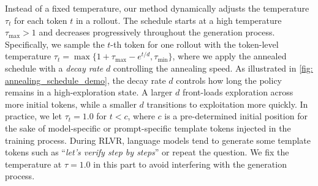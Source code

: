 Instead of a fixed temperature, our method dynamically adjusts the temperature $\tau_t$ for each token $t$ in a rollout. The schedule starts at a high temperature $\tau_\mathrm{max} > 1$ and decreases progressively throughout the generation process.
%
Specifically, we sample the $t$-th token for one rollout 
with the token-level temperature $\tau_t = \max\{1 + \tau_\mathrm{max} - e^{t/d}, \tau_\mathrm{min}\}$,
%
%
where we apply the annealed schedule with a \emph{decay rate} $d$ controlling the annealing speed.
%
As illustrated in \cref{fig: annealing_schedule_demo}, the decay rate $d$ controls how long the policy remains in a high-exploration state. A larger $d$ front-loads exploration across more initial tokens, while a smaller $d$ transitions to exploitation more quickly. 
%
In practice, we let $\tau_t = 1.0$ for $t<c$, where $c$ is a pre-determined initial position for the sake of model-specific or prompt-specific template tokens injected in the training process. 
%
During RLVR, language models tend to generate some template tokens such as ``\textit{let's verify step by steps}'' or repeat the question. 
%
%
We fix the temperature at $\tau = 1.0$ in this part to avoid interfering with the generation process.
%


